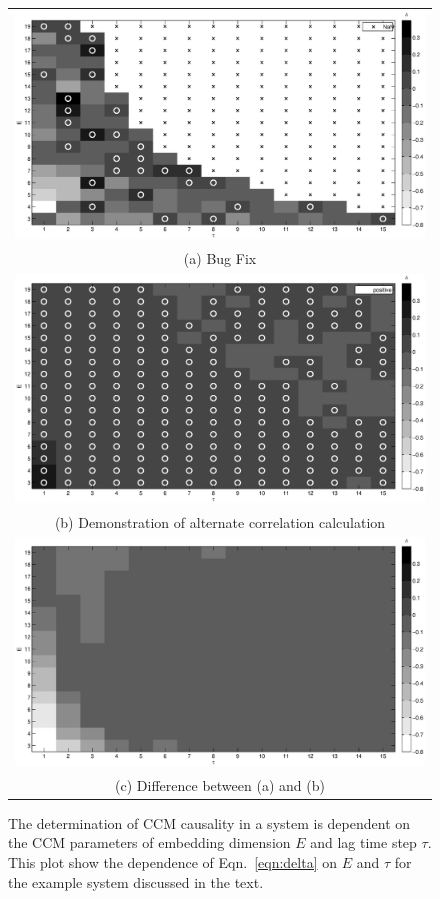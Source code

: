 \documentclass[a4paper,11pt]{article}
\begin{document}
\begin{figure}[ht]
\label{fig:}
\begin{tabular}{c}
\includegraphics[scale=0.45]{Figure2.eps}\\
(a) Bug Fix \\
\includegraphics[scale=0.45]{Figure2_alt.eps}\\
(b) Demonstration of alternate correlation calculation \\[6pt]
\includegraphics[scale=0.45]{Figure2_diff.eps}\\
(c) Difference between (a) and (b)
\end{tabular}
\caption{The determination of CCM causality in a system is dependent on the CCM parameters of embedding dimension $E$ and lag time step $\tau$.  This plot show the dependence of Eqn.\ \ref{eqn:delta} on $E$ and $\tau$ for the example system discussed in the text.}
\end{figure}
\end{document}
